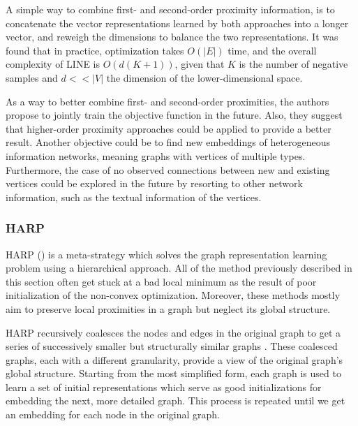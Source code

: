 A simple way to combine first- and second-order proximity information, is to concatenate the vector representations learned by both approaches into a longer vector, and reweigh the dimensions to balance the two representations. It was found that in practice, optimization takes $O(|E|)$ time, and the overall complexity of LINE is $O(d(K+1))$, given that $K$ is the number of negative samples and $d<<|V|$ the dimension of the lower-dimensional space.

As a way to better combine first- and second-order proximities, the authors propose to jointly train the objective function in the future. Also, they suggest that higher-order proximity approaches could be applied to provide a better result. Another objective could be to find new embeddings of heterogeneous information networks, meaning graphs with vertices of multiple types. Furthermore, the case of no observed connections between new and existing vertices could be explored in the future by resorting to other network information, such as the textual information of the vertices.

\subsubsection{HARP}

HARP (\cite{DBLP:journals/corr/ChenPHS17}) is a meta-strategy which solves the graph representation learning problem using a hierarchical approach. All of the method previously described in this section often get stuck at a bad local minimum as the result of poor initialization of the non-convex optimization. Moreover, these methods mostly aim to preserve local proximities in a graph but neglect its global structure.

HARP recursively coalesces the nodes and edges in the original graph to get a series of successively smaller but structurally similar graphs . These coalesced graphs, each with a different granularity, provide a view of the original graph’s global structure. Starting from the most simplified form, each graph is used to learn a set of initial representations which serve as good initializations for embedding the next, more detailed graph. This process is repeated until we get an embedding for each node in the original graph.

